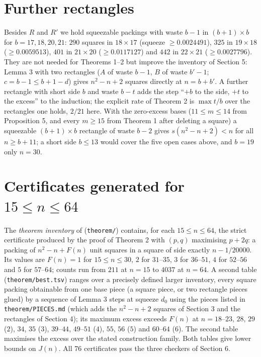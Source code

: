 \documentclass[11pt,letterpaper]{amsart}
\theoremstyle{plain}
\begin{document}
\section{Further rectangles}

Besides $R$ and $R'$ we hold squeezable packings with waste $b - 1$ in $(b+1) \times b$ for $b = 17, 18, 20, 21$: $290$ squares in $18 \times 17$ (squeeze $\ge 0.0024491$), $325$ in $19 \times 18$ ($\ge 0.0059513$), $401$ in $21 \times 20$ ($\ge 0.0117127$) and $442$ in $22 \times 21$ ($\ge 0.0027796$). They are not needed for Theorems 1--2 but improve the inventory of Section 5: Lemma 3 with two rectangles ($A$ of waste $b - 1$, $B$ of waste $b' - 1$; $c = b - 1 \le b + 1 - d$) gives $n^2 - n + 2$ squares directly at $n = b + b'$. A further rectangle with short side $b$ and waste $b - t$ adds the step ``$+b$ to the side, $+t$ to the excess'' to the induction; the explicit rate of Theorem 2 is $\max t/b$ over the rectangles one holds, $2/21$ here. With the zero-excess bases ($11 \le m \le 14$ from Proposition 5, and every $m \ge 15$ from Theorem 1 after deleting a square) a squeezable $(b+1) \times b$ rectangle of waste $b - 2$ gives $s(n^2 - n + 2) < n$ for all $n \ge b + 11$; a short side $b \le 13$ would cover the five open cases above, and $b = 19$ only $n = 30$.

\section{Certificates generated for \texorpdfstring{$15 \le n \le 64$}{15 <= n <= 64}}

The \emph{theorem inventory} of \cite{Fan26} (\texttt{theorem/}) contains, for each $15 \le n \le 64$, the strict certificate produced by the proof of Theorem 2 with $(p, q)$ maximising $p + 2q$: a packing of $n^2 - n + F(n)$ unit squares in a square of side exactly $n - 1/20000$. Its values are $F(n) = 1$ for $15 \le n \le 30$, $2$ for $31$--$35$, $3$ for $36$--$51$, $4$ for $52$--$56$ and $5$ for $57$--$64$; counts run from $211$ at $n = 15$ to $4037$ at $n = 64$. A second table (\texttt{theorem/best.tsv}) ranges over a precisely defined larger inventory, every square packing obtainable from one base piece (a square piece, or two rectangle pieces glued) by a sequence of Lemma 3 steps at squeeze $d_0$ using the pieces listed in \texttt{theorem/PIECES.md} (which adds the $n^2 - n + 2$ squares of Section 3 and the rectangles of Section 4); its maximum excess exceeds $F(n)$ at $n = 18$--$23$, $28$, $29$ ($2$), $34$, $35$ ($3$), $39$--$44$, $49$--$51$ ($4$), $55$, $56$ ($5$) and $60$--$64$ ($6$). The second table maximises the excess over the stated construction family. Both tables give lower bounds on $J(n)$. All $76$ certificates pass the three checkers of Section 6.
\end{document}
